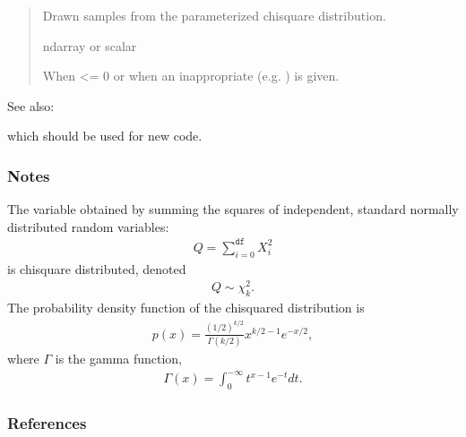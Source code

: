\documentclass[letterpaper,10pt,english]{sphinxmanual}
\begin{document}
\begin{fulllineitems}
\begin{quote}
\begin{description}
\begin{itemize}
\end{itemize}

\sphinxAtStartPar
{} \textendash{} Drawn samples from the parameterized chi\sphinxhyphen{}square distribution.

\sphinxAtStartPar
ndarray or scalar

\sphinxAtStartPar
{} \textendash{} When  \textless{}= 0 or when an inappropriate  (e.g. )
    is given.

\end{description}\end{quote}


\begin{sphinxseealso}{See also:}
\begin{description}
\sphinxAtStartPar
which should be used for new code.

\end{description}


\end{sphinxseealso}

\subsubsection*{Notes}

\sphinxAtStartPar
The variable obtained by summing the squares of  independent,
standard normally distributed random variables:
\begin{equation*}
\begin{split}Q = \sum_{i=0}^{\mathtt{df}} X^2_i\end{split}
\end{equation*}
\sphinxAtStartPar
is chi\sphinxhyphen{}square distributed, denoted
\begin{equation*}
\begin{split}Q \sim \chi^2_k.\end{split}
\end{equation*}
\sphinxAtStartPar
The probability density function of the chi\sphinxhyphen{}squared distribution is
\begin{equation*}
\begin{split}p(x) = \frac{(1/2)^{k/2}}{\Gamma(k/2)}
x^{k/2 - 1} e^{-x/2},\end{split}
\end{equation*}
\sphinxAtStartPar
where \(\Gamma\) is the gamma function,
\begin{equation*}
\begin{split}\Gamma(x) = \int_0^{-\infty} t^{x - 1} e^{-t} dt.\end{split}
\end{equation*}\subsubsection*{References}

\end{fulllineitems}
\end{document}
